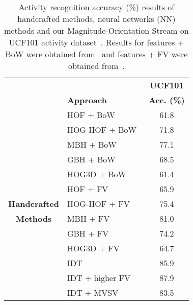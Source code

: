 \documentclass[10pt,conference]{IEEEtran}
\begin{document}
\begin{table}[!htb]
	\centering
	\begin{small}
		\caption{Activity recognition accuracy (\%) results of handcrafted methods, neural networks (NN) methods and our Magnitude-Orientation Stream on UCF101 activity dataset~\cite{Soomro:2012}. Results for features + BoW were obtained from~\cite{Shi:2015} and features + FV were obtained from~\cite{Shi:2014:Dissertation}.}
		\begin{tabular}{clc}
			\toprule
			& & \multicolumn{1}{c}{\textbf{UCF101}} \\
			& \textbf{Approach} & \multicolumn{1}{c}{\textbf{Acc. (\%)}} \\
			\toprule
			& HOF + BoW~\cite{Laptev:2008} & \multicolumn{1}{c}{61.8}  \\ 
			& HOG-HOF + BoW~\cite{Laptev:2008} & \multicolumn{1}{c}{71.8}  \\ 
			& MBH + BoW~\cite{Dalal:2006} & \multicolumn{1}{c}{77.1}  \\ 
			& GBH + BoW~\cite{Shi:2015} & \multicolumn{1}{c}{68.5}  \\ 
			& HOG3D + BoW~\cite{Klaser:2008} & \multicolumn{1}{c}{61.4}  \\ 
			
			& HOF + FV~\cite{Laptev:2008} & \multicolumn{1}{c}{65.9} \\ 
			\multirow{1}{*}{\textbf{Handcrafted}} & HOG-HOF + FV~\cite{Laptev:2008} & \multicolumn{1}{c}{75.4}  \\ 
			\multirow{1}{*}{\textbf{Methods}} & MBH + FV~\cite{Dalal:2006} & \multicolumn{1}{c}{81.0}  \\  
			& GBH + FV~\cite{Shi:2015} & \multicolumn{1}{c}{74.2} \\  
			& HOG3D + FV~\cite{Klaser:2008} & \multicolumn{1}{c}{64.7}  \\ 
			
			& IDT~\cite{Wang:2013} & \multicolumn{1}{c}{85.9}  \\ 
			& IDT + higher FV~\cite{Peng:2016} & \multicolumn{1}{c}{87.9} \\
			& IDT + MVSV~\cite{Cai:2014} & \multicolumn{1}{c}{83.5} \\
			\midrule
			

\end{tabular}
\end{small}
\end{table}
\end{document}
